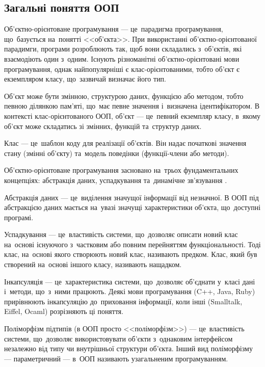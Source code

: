 \documentclass[a4paper,oneside,titlepage,14pt]{extarticle}
\begin{document}
		\subsection{Загальні поняття ООП}
			Об'\-єкт\-но-орієнтоване програмування --- це~парадигма програмування, що~базується на~понятті <<об'єкта>>. При використанні об'\-єкт\-но-орі\-єн\-то\-ва\-но\-ї парадимги, програми розроблюють так, щоб вони складались з~об'\-єк\-тів, які взаємодіють один з~одним. Існують різноманітні об'\-єкт\-но-орі\-єн\-то\-ва\-ні мови програмування, однак найпопулярніші є клас-орієнтованими, тобто об'\-єкт є екземпляром класу, що~зазвичай визначає його тип.\par
			Об'\-єкт може бути змінною, структурою даних, функцією або методом, тобто певною ділянкою пам'яті, що~має певне значення і~визначена ідентифікатором. В контексті клас-орієнтованого ООП, об'\-єкт --- це~певний екземпляр класу, в~якому об'\-єкт може складатись зі змінних, функцій та~структур даних.\par
			Клас --- це~шаблон коду для реалізації об'\-єктів. Він надає початкові значення стану (змінні об'\-єк\-ту) та~модель поведінки (функції-члени або методи).\par
			Об'\-єкт\-но-орі\-єн\-то\-ва\-не програмування засновано на~трьох фундаментальних концепціях: абстракція даних, успадкування та~динамічне зв'я\-зу\-ван\-ня \cite{lippmancpp}.\par
			Абстракція даних --- це~виділення значущої інформації від незначної. В ООП під абстракцією даних мається на~увазі значущі характеристики об'\-єк\-та, що~доступні програмі.\par
			Успадкування --- це~властивість системи, що~дозволяє описати новий клас на~основі існуючого з~частковим або повним перейняттям функціональності. Тоді клас, на~основі якого створюють новий клас, називають предком. Клас, який був створений на~основі іншого класу, називають нащадком.\par
			Інкапсуляція --- це~характеристика системи, що~дозволяє об'\-єд\-на\-ти у~класі дані і~методи, що~з~ними працюють. Деякі мови програмування (C++, Java, Ruby) прирівнюють інкапсуляцію до~приховання інформації, коли інші (Smalltalk, Eiffel, Ocaml) розрізняють ці поняття.\par
			Поліморфізм підтипів (в ООП просто <<поліморфізм>>) --- це~властивість системи, що~дозволяє використовувати об'\-єк\-ти з~однаковим інтерфейсом незалежно від типу чи внутрішньої структури об'\-єк\-та. Інший вид поліморфізму --- параметричний --- в~ООП називають узагальненим програмуванням.\par
\end{document}
